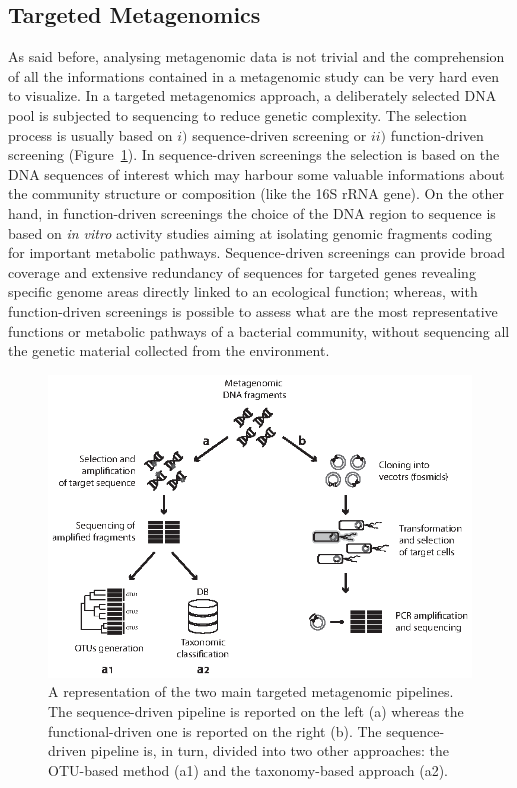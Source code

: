 \subsection{Targeted Metagenomics \label{par:tarmet}}
As said before, analysing metagenomic data is not trivial and the comprehension of all the informations contained in a metagenomic study can be very hard even to visualize. In a targeted metagenomics approach, a deliberately selected DNA pool is subjected to sequencing to reduce genetic complexity. The selection process is usually based on $i)$ sequence-driven screening or $ii)$ function-driven screening (Figure~\ref{fig:tarpipe}). In sequence-driven screenings the selection is based on the DNA sequences of interest which may harbour some valuable informations about the community structure or composition (like the 16S rRNA gene). On the other hand, in function-driven screenings the choice of the DNA region to sequence is based on \textit{in vitro} activity studies aiming at isolating genomic fragments coding for important metabolic pathways. Sequence-driven screenings can provide broad coverage and extensive redundancy of sequences for targeted genes revealing specific genome areas directly linked to an ecological function; whereas, with function-driven screenings is possible to assess what are the most representative functions or metabolic pathways of a bacterial community, without sequencing all the genetic material collected from the environment.\\%
\begin{figure}[!tb]
	\centering
	\includegraphics[width=1\textwidth]{./figures/Introduction/targeted_pipeline}
  	\caption{A representation of the two main targeted metagenomic pipelines. The sequence-driven pipeline is reported on the left (a) whereas the functional-driven one is reported on the right (b). The sequence-driven pipeline is, in turn, divided into two other approaches: the OTU-based method (a1) and the taxonomy-based approach (a2).\label{fig:tarpipe}}
\end{figure}%

